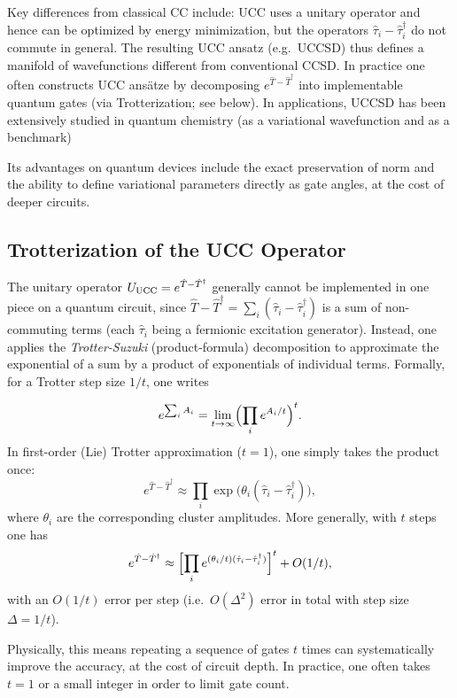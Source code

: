 \documentclass[twocolumn,superscriptaddress,unsortedaddress,nofootinbib,amsmath,amssymb,
aps,floatfix]{revtex4-2}
\begin{document}
Key differences from classical CC include: UCC uses a unitary operator
and hence can be optimized by energy minimization, but the operators
$\hat \tau_i - \hat \tau_i^\dagger$ do not commute in general.  The
resulting UCC ansatz (e.g.\ UCCSD) thus defines a manifold of
wavefunctions different from conventional CCSD.  In practice one often
constructs UCC ansätze by decomposing $e^{\hat T-\hat T^\dagger}$ into
implementable quantum gates (via Trotterization; see below).  In
applications, UCCSD has been extensively studied in quantum chemistry
(as a variational wavefunction and as a benchmark)

Its advantages on quantum devices include the exact preservation of
norm and the ability to define variational parameters directly as gate
angles, at the cost of deeper circuits.

\subsection{Trotterization of the UCC Operator}

The unitary operator $U_{\rm UCC}=e^{\hat T-\hat T^\dagger}$ generally
cannot be implemented in one piece on a quantum circuit, since $\hat
T-\hat T^\dagger = \sum_i (\hat \tau_i - \hat \tau_i^\dagger)$ is a
sum of non-commuting terms (each $\hat \tau_i$ being a fermionic
excitation generator).  Instead, one applies the \emph{Trotter-Suzuki}
(product-formula) decomposition to approximate the exponential of a
sum by a product of exponentials of individual terms.  Formally, for a
Trotter step size $1/t$, one writes

\[
e^{\sum_i A_i} = \lim_{t\to\infty}\Bigl(\prod_i e^{A_i/t}\Bigr)^t.
\]
In first-order (Lie) Trotter approximation ($t=1$), one simply takes the product once:
\begin{equation}\label{eq:trotter1}
e^{\hat T-\hat T^\dagger} \approx \prod_i \exp\!\bigl(\theta_i(\hat\tau_i - \hat\tau_i^\dagger)\bigr),
\end{equation}
where $\theta_i$ are the corresponding cluster amplitudes.
More generally, with $t$ steps one has 
\[
e^{\hat T-\hat T^\dagger} \approx \Bigl[\prod_i e^{(\theta_i/t)(\hat\tau_i - \hat\tau_i^\dagger)}\Bigr]^t + O(1/t),
\]
with an $O(1/t)$ error per step (i.e.\ $O(\Delta^2)$ error in total with step size $\Delta=1/t$).

Physically, this means repeating a sequence of gates $t$ times can
systematically improve the accuracy, at the cost of circuit depth.  In
practice, one often takes $t=1$ or a small integer in order to limit
gate count.
\end{document}
